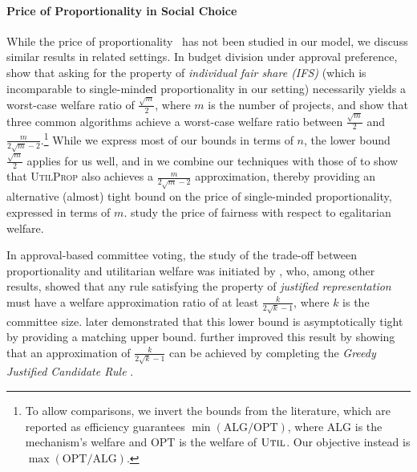 \documentclass[11pt]{article}
\newcommand{\Ut}{\textsc{Util} }
\newcommand{\UtP}{\textsc{UtilProp} }
\begin{document}
\paragraph{Price of Proportionality in Social Choice}
While the price of proportionality~\citep{bertsimas2011price,caragiannis2012efficiency} has not been studied in our model, we discuss similar results in related settings. 
In budget division under approval preference, \citet{MPS20a} show that asking for the property of \emph{individual fair share (IFS)} (which is incomparable to single-minded proportionality in our setting) necessarily yields a worst-case welfare ratio of $\textstyle\frac{\sqrt{m}}{2}$, where $m$ is the number of projects, and show that three common algorithms achieve a worst-case welfare ratio between $\frac{\sqrt{m}}{2}$ and $\frac{m}{2\sqrt{m} -2}$.\footnote{To allow comparisons, we invert the bounds from the literature, which are reported as efficiency guarantees $\min(\text{ALG}/\text{OPT})$, where $\text{ALG}$ is the mechanism’s welfare and $\text{OPT}$ is the welfare of $\Ut$. Our objective instead is $\max(\text{OPT}/\text{ALG})$.} While we express most of our bounds in terms of $n$, the lower bound $\frac{\sqrt{m}}{2}$ applies for us well, and in  we combine our techniques with those of \citet{MPS20a} to show that \UtP also achieves a $\frac{m}{2\sqrt{m} - 2}$ approximation, thereby providing an alternative (almost) tight bound on the price of single-minded proportionality, expressed in terms of $m$.
\citet{TWZ20b} study the price of fairness with respect to egalitarian welfare.

In approval-based committee voting, the study of the trade-off between proportionality and utilitarian welfare was initiated by \citet{LaSk20b}, who, among other results, showed that any rule satisfying the property of \emph{justified representation} must have a welfare approximation ratio of at least 
$\textstyle\frac{k}{2\sqrt{k}-1}$, where $k$ is the committee size. \citet{EFI+24b} later demonstrated that this lower bound is asymptotically tight by providing a matching upper bound. \citet{BrPe24b} further improved this result by showing that an approximation of $\textstyle\frac{k}{2\sqrt{k}-1}$ can be achieved by completing the \emph{Greedy Justified Candidate Rule} \cite{BrPe23a}.
\end{document}
